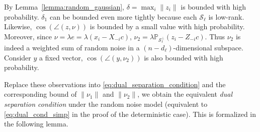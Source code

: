 \documentclass[twoside,11pt]{article}
\numberwithin{equation}{section}
\begin{document}
By Lemma~\ref{lemma:random_gaussian}, $\delta = \max_i \|z_i\|$ is bounded with high probability. $\delta_1$ can be bounded even more tightly because each $\mathcal{S}_{\ell}$ is low-rank. Likewise, $\cos(\angle(z,\nu))$ is bounded by a small value with high probability. Moreover, since $\nu=\lambda e=\lambda(x_i-X_{-i}c)$, $\nu_2 = \lambda\mathbb{P}_{\mathcal{S}^{\perp}_{\ell}}(z_i - Z_{-i}c)$. Thus $\nu_2$ is indeed a weighted sum of random noise in a $(n-d_{\ell})$-dimensional subspace. Consider $y$ a fixed vector, $\cos(\angle(y,\nu_2))$ is also bounded with high probability.

Replace these observations into \eqref{eq:dual_separation_condition} and the corresponding bound of $\|\nu_1\|$ and $\|\nu_2\|$, we obtain the equivalent \emph{dual separation condition} under the random noise model (equivalent to \eqref{eq:dual_cond_simp} in the proof of the deterministic case). This is formalized in the following lemma.
\end{document}
